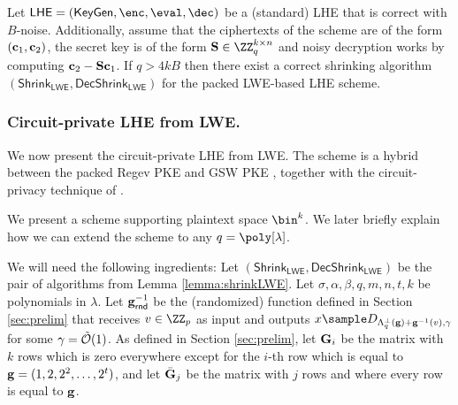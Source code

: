 \begin{lemma}
\label{lemma:shrinkLWE}
Let $\mathsf{LHE}=(\keygen,\enc,\eval,\dec)$ be a (standard) LHE that is correct with $B$-noise. Additionally, assume that the ciphertexts of the scheme are of the form $(\mathbf{c}_1,\mathbf{c}_2)$, the secret key is of the form $\Sn\in\ZZ_q^{k\times n}$ and noisy decryption works by computing $\mathbf{c}_2-\mathbf{S}\mathbf{c}_1$. If $q>4kB$ then there exist a correct shrinking algorithm $(\mathsf{Shrink}_{\mathsf{LWE}},\mathsf{DecShrink}_\mathsf{LWE})$ for the packed LWE-based LHE scheme.
\end{lemma}






\subsubsection{Circuit-private LHE from LWE.} We now present the circuit-private LHE from LWE. The scheme is a hybrid between the packed Regev PKE \cite{STOC:GenPeiVai08} and GSW PKE \cite{C:GenSahWat13}, together with the circuit-privacy technique of \cite{C:BdMW16}.

We present a scheme supporting plaintext space $\bin^k$. We later briefly explain how we can extend the scheme to any $q=\poly[\lambda]$. %

We will need the following ingredients: Let $(\mathsf{Shrink}_{\mathsf{LWE}},\mathsf{DecShrink}_\mathsf{LWE})$ be the pair of algorithms from Lemma \ref{lemma:shrinkLWE}. Let $\sigma,\alpha,\beta,q,m,n,t,k$ be polynomials in $\lambda$. Let $\mathbf{g}^{-1}_\mathsf{rnd}$ be the (randomized) function defined in Section \ref{sec:prelim} that receives $v\in\ZZ_p$ as input and outputs  $x\sample D_{\Lambda^\perp_q(\gn)+\gn^{-1}(v),\gamma}$ for some $\gamma=\tilde {\mathcal{O}}(1)$. As defined in Section \ref{sec:prelim}, let $\mathbf{G}_i$ be the matrix with $k$ rows which is zero everywhere except for the $i$-th row which is equal to $\mathbf{g}=(1,2,2^2,\dots, 2^t)$, and let $\bar {\mathbf{G}}_j$ be the matrix with $j$ rows and where every row is equal to $\mathbf{g}$. %


